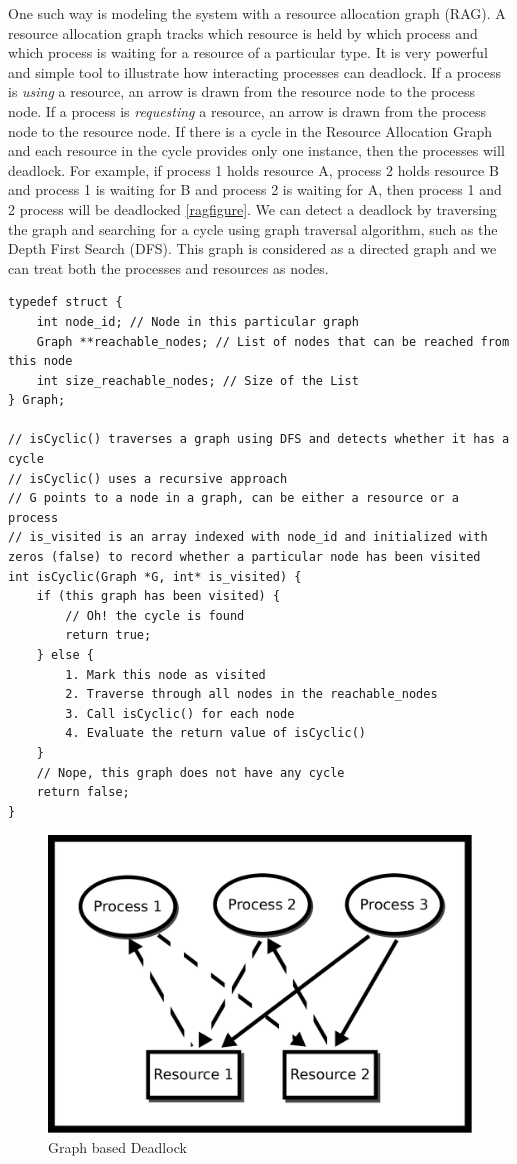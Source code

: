 One such way is modeling the system with a resource allocation graph (\gls{RAG}).
A resource allocation graph tracks which resource is held by which process and which process is waiting for a resource of a particular type.
It is very powerful and simple tool to illustrate how interacting processes can deadlock.
If a process is \emph{using} a resource, an arrow is drawn from the resource node to the process node.
If a process is \emph{requesting} a resource, an arrow is drawn from the process node to the resource node.
If there is a cycle in the Resource Allocation Graph and each resource in the cycle provides only one instance, then the processes will deadlock.
For example, if process 1 holds resource A, process 2 holds resource B and process 1 is waiting for B and process 2 is waiting for A, then process 1 and 2 process will be deadlocked \ref{ragfigure}.
We can detect a deadlock by traversing the graph and searching for a cycle using graph traversal algorithm, such as the Depth First Search (DFS).
This graph is considered as a directed graph and we can treat both the processes and resources as nodes.

\begin{verbatim}
typedef struct {
	int node_id; // Node in this particular graph
	Graph **reachable_nodes; // List of nodes that can be reached from this node
	int size_reachable_nodes; // Size of the List
} Graph;

// isCyclic() traverses a graph using DFS and detects whether it has a cycle
// isCyclic() uses a recursive approach
// G points to a node in a graph, can be either a resource or a process
// is_visited is an array indexed with node_id and initialized with zeros (false) to record whether a particular node has been visited
int isCyclic(Graph *G, int* is_visited) {
	if (this graph has been visited) {
		// Oh! the cycle is found
		return true;
	} else {
		1. Mark this node as visited
		2. Traverse through all nodes in the reachable_nodes
		3. Call isCyclic() for each node
		4. Evaluate the return value of isCyclic()
	}
	// Nope, this graph does not have any cycle
	return false;
}
\end{verbatim}

\begin{figure}[H]
\centering
\includegraphics[width=.5\textwidth]{deadlock/drawings/deadlock.eps}
\caption{Graph based Deadlock}
\end{figure}

